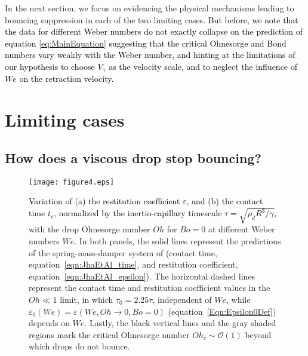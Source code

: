\documentclass{jfm}
\newcommand{\Ohn}{\mathit{Oh}}
\newcommand{\Ohc}{\mathit{Oh}_\mathit{c}}
\newcommand{\Wen}{\mathit{We}}
\newcommand{\Bon}{\mathit{Bo}}
\newcommand{\revRev}[1]{\textcolor{black}{#1}}
\begin{document}
In the next section, we focus on evidencing the physical mechanisms leading to bouncing suppression in each of the two limiting cases.
\revRev{But before, we note that the data for different Weber numbers do not exactly collapse on the prediction of equation \eqref{eq:MainEquation} suggesting that the critical Ohnesorge and Bond numbers vary weakly with the Weber number, and hinting at the limitations of our hypothesis to choose $V_\gamma$ as the velocity scale, and to neglect the influence of $\Wen$ on the retraction velocity.}




\section{Limiting cases}\label{sec:LimitingCases}
\subsection{How does a viscous drop stop bouncing?}\label{sec:LimitingCases:Oh}
\begin{figure}
	\centering
	\texttt{[image: figure4.eps]}
	\caption{\revRev{Variation of (a) the restitution coefficient $\varepsilon$, and (b) the contact time $t_c$, normalized by the inertio-capillary timescale $\tau = \sqrt{\rho_dR^3/\gamma}$,} with the drop Ohnesorge number $\Ohn$ for $\Bon = 0$ at different Weber numbers $\Wen$. 
	In both panels, the solid lines represent the predictions of the spring-mass-damper system of \citet{jha2020viscous} (contact time, equation~\ref{eqn:JhaEtAl_time}, and restitution coefficient, equation~\ref{eqn:JhaEtAl_epsilon}). 
	The horizontal dashed lines represent the contact time and restitution coefficient values in the $\Ohn \ll 1$ limit, in which $\tau_0 = 2.25\tau$, independent of $\Wen$, while $\varepsilon_0\left(\Wen\right) = \varepsilon\left(\Wen, \Ohn \to 0, \Bon = 0\right)$ (equation~\eqref{Eqn:Epsilon0Def}) depends on $\Wen$.
	Lastly, the black vertical lines and the gray shaded regions mark the critical Ohnesorge number $\Ohc \sim \mathcal{O}\left(1\right)$ beyond which drops do not bounce.}
	\label{fig:Ohlim}
\end{figure}
\end{document}
